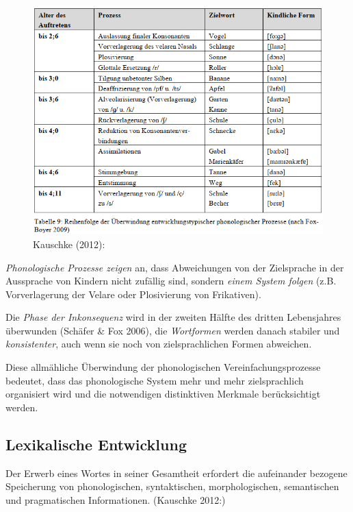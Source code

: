 \documentclass[
  letterpaper,
]{scrbook}
\begin{document}
\begin{figure}

{\centering \includegraphics[width=1\textwidth,height=\textheight]{./pictures/L1_Entwicklung_kauschke_Tab9.png}

}

\caption{Kauschke (2012):}

\end{figure}

\emph{Phonologische Prozesse zeigen} an, dass Abweichungen von der
Zielsprache in der Aussprache von Kindern nicht zufällig sind, sondern
\emph{einem System folgen} (z.B. Vorverlagerung der Velare oder
Plosivierung von Frikativen).

Die \emph{Phase der Inkonsequenz} wird in der zweiten Hälfte des dritten
Lebensjahres überwunden (Schäfer \& Fox 2006), die \emph{Wortformen}
werden danach stabiler und \emph{konsistenter}, auch wenn sie noch von
zielsprachlichen Formen abweichen.

Diese allmähliche Überwindung der phonologischen Vereinfachungsprozesse
bedeutet, dass das phonologische System mehr und mehr zielsprachlich
organisiert wird und die notwendigen distinktiven Merkmale
berücksichtigt werden.

\hypertarget{lexikalische-entwicklung}{%
\subsection{Lexikalische Entwicklung}\label{lexikalische-entwicklung}}

Der Erwerb eines Wortes in seiner Gesamtheit erfordert die aufeinander
bezogene Speicherung von phonologischen, syntaktischen, morphologischen,
semantischen und pragmatischen Informationen. (Kauschke 2012:)
\end{document}
